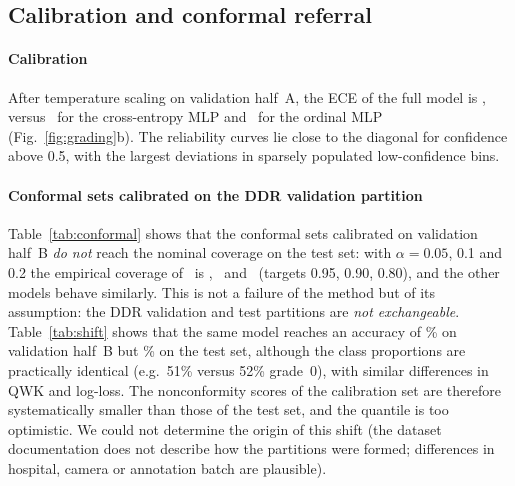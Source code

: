 \subsection{Calibration and conformal referral}
\label{sec:res-conf}
\paragraph{Calibration} After temperature scaling on validation half~A, the ECE of the full model is \nMainECE, versus \nBoneECE\ for the cross-entropy MLP and \nBtwoECE\ for the ordinal MLP (Fig.~\ref{fig:grading}b). The reliability curves lie close to the diagonal for confidence above 0.5, with the largest deviations in sparsely populated low-confidence bins.

\paragraph{Conformal sets calibrated on the DDR validation partition} Table~\ref{tab:conformal} shows that the conformal sets calibrated on validation half~B \emph{do not} reach the nominal coverage on the test set: with $\alpha=0.05$, 0.1 and 0.2 the empirical coverage of \mname\ is \nConfCovFive, \nConfCovTen\ and \nConfCovTwenty\ (targets 0.95, 0.90, 0.80), and the other models behave similarly. This is not a failure of the method but of its assumption: the DDR validation and test partitions are \emph{not exchangeable}. Table~\ref{tab:shift} shows that the same model reaches an accuracy of \nValBAcc\% on validation half~B but \nTestAcc\% on the test set, although the class proportions are practically identical (e.g.\ 51\% versus 52\% grade~0), with similar differences in QWK and log-loss. The nonconformity scores of the calibration set are therefore systematically smaller than those of the test set, and the quantile is too optimistic. We could not determine the origin of this shift (the dataset documentation does not describe how the partitions were formed; differences in hospital, camera or annotation batch are plausible).

